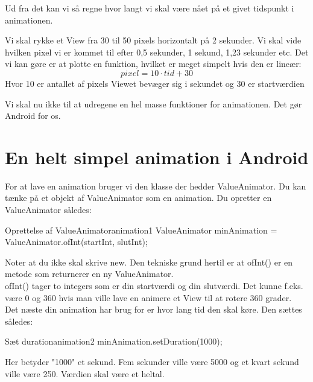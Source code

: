 Ud fra det kan vi så regne hvor langt vi skal være nået på et givet tidspunkt i animationen. 
\begin{example}
	Vi skal rykke et View fra 30 til 50 pixels horizontalt på 2 sekunder. Vi skal vide hvilken pixel vi er kommet til efter 0,5 sekunder, 1 sekund, 1,23 sekunder etc. Det vi kan gøre er at plotte en funktion, hvilket er meget simpelt hvis den er lineær:
	\begin{equation}
	pixel=10\cdot tid+30
	\end{equation}
	Hvor 10 er antallet af pixels Viewet bevæger sig i sekundet og 30 er startværdien
\end{example}
Vi skal nu ikke til at udregene en hel masse funktioner for animationen. Det gør Android for os.
\section{En helt simpel animation i Android}
For at lave en animation bruger vi den klasse der hedder ValueAnimator. Du kan tænke på et objekt af ValueAnimator som en animation. Du opretter en ValueAnimator således:
\begin{JavaCode}{Oprettelse af ValueAnimator}{animation1}
	ValueAnimator minAnimation = ValueAnimator.ofInt(startInt, slutInt);
\end{JavaCode}
Noter at du ikke skal skrive new. Den tekniske grund hertil er at ofInt() er en metode som returnerer en ny ValueAnimator. \\
ofInt() tager to integers som er din startværdi og din slutværdi. Det kunne f.eks. være 0 og 360 hvis man ville lave en animere et View til at rotere 360 grader. \\
Det næste din animation har brug for er hvor lang tid den skal køre. Den sættes således:
\begin{JavaCode}{Sæt duration}{animation2}
	minAnimation.setDuration(1000);	
\end{JavaCode}
Her betyder "1000" et sekund. Fem sekunder ville være 5000 og et kvart sekund ville være 250. Værdien skal være et heltal. 
